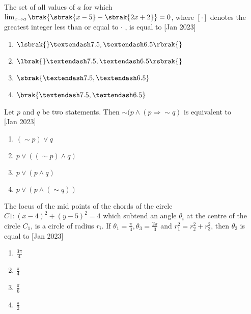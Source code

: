 
    \iffalse
    \title{Assignment}
    \author{ee24btech11059}
    \section{mcq-single}
    \fi
    \item{
          	The set of all values of $a$ for which $\lim_{x\to a} \brak{\sbrak{x-5} - \sbrak{2x+2}}= 0$, where $[\cdot]$ denotes the greatest integer less than or equal to $\cdot$ , is equal to \text{  } \hfill
                {[Jan 2023]}
                \begin{multicols}{4}
					\begin{enumerate}
						\item $\lsbrak{}–7.5, –6.5\rbrak{} $
						\item $\lbrak{}–7.5, –6.5\rsbrak{} $
						\item $\sbrak{–7.5, –6.5} $
						\item $\brak{–7.5, –6.5} $
					\end{enumerate}
				\end{multicols}
            }
    \item{
           	Let $p$ and $q$ be two statements. Then $\sim (p \land (p \Rightarrow \sim q)$ is equivalent to \\ \text{ }
           	\hfill
           	{[Jan 2023]}
                \begin{multicols}{4}
                	\begin{enumerate}
                		\item $(\sim p) \lor q$
                		\item $p \lor ((\sim p) \land q)$
                		\item $p \lor (p \land q)$
                		\item $p \lor (p \land(\sim q))$
                	\end{enumerate}
                \end{multicols}
        }
\item{
        	
        	The locus of the mid points of the chords of the circle $C1: (x - 4)^2 + (y - 5)^2 = 4$ which subtend an angle $\theta_i$ at the centre of the circle $C_1$, is a circle of radius $r_i$. If $\theta_1 = \frac{\pi}{3}, \theta_3 = \frac{2\pi}{3}$ and $r_1^2 = r_2^2+r_3^2$, then $\theta_2$ is equal to
        	\hfill
        	{[Jan 2023]}
        	\begin{multicols}{4}
        		\begin{enumerate}
        			\item  $\frac{3\pi}{4}$
        			\item  $\frac{\pi}{4}$
        			\item  $\frac{\pi}{6}$
        			\item  $\frac{\pi}{2}$
        		\end{enumerate}
        	\end{multicols}
        	
        }
